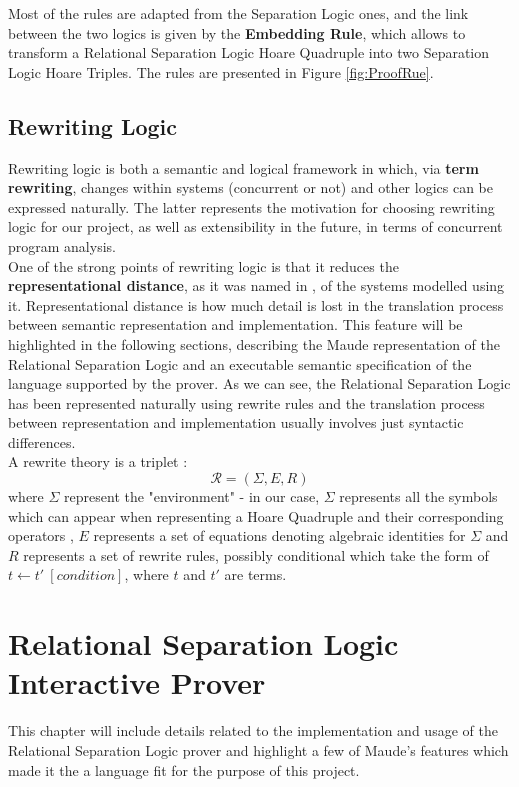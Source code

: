 \documentclass[12pt,a4paper]{article}
\begin{document}
Most of the rules are adapted from the Separation Logic ones, and the link between the two logics is given by the \textbf{Embedding Rule}, which allows to transform a Relational Separation Logic Hoare Quadruple into two Separation Logic Hoare Triples. The rules are presented in Figure \ref{fig:ProofRue}. 
\clearpage
\subsection{Rewriting Logic}
Rewriting logic is both a semantic and logical framework \cite{rewritingLogic} in which, via \textbf{term rewriting}, changes within systems (concurrent or not) and other logics can be expressed naturally. The latter represents the motivation for choosing rewriting logic for our project, as well as extensibility in the future, in terms of concurrent program analysis. \\

One of the strong points of rewriting logic is that it reduces the \textbf{representational distance}, as it was named in \cite{rewritingLogic}, of the systems modelled using it. Representational distance is how much detail is lost in the translation process between semantic representation and implementation. This feature will be highlighted in the following sections, describing the Maude representation of the Relational Separation Logic and an executable semantic specification of the language supported by the prover. As we can see, the Relational Separation Logic has been represented naturally using rewrite rules and the translation process between representation and implementation usually involves just syntactic differences.\\

A rewrite theory is a triplet : \[\mathcal{R} = (\Sigma, E, R)\]
where \(\Sigma\) represent the "environment" - in our case, \(\Sigma\) represents all the symbols which can appear when representing a Hoare Quadruple and their corresponding operators , \(E\) represents a set of equations denoting algebraic identities for \(\Sigma\) and \(R\) represents a set of rewrite rules, possibly conditional which take the form of \(t \leftarrow t\prime\ [condition]\), where \(t\) and \(t\prime\) are terms. 
\section{Relational Separation Logic Interactive Prover} 
This chapter will include details related to the implementation and usage of the Relational Separation Logic prover and highlight a few of Maude's features which made it the a language fit for the purpose of this project.
\end{document}

